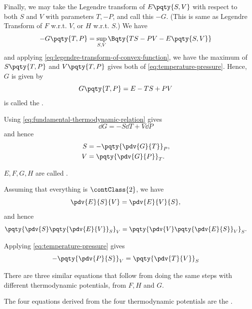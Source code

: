 \begin{example}
    Finally, we may take the Legendre transform of \(E \pqty{S, V}\) with respect to both \(S\) and \(V\) with parameters \(T, -P\), and call this \(-G\). (This is same as Legendre Transform of \(F\) w.r.t. \(V\), or \(H\) w.r.t. \(S\).) We have
    \[
        -G \pqty{T, P} = \sup_{S, V} \Bqty{TS - PV - E \pqty{S, V}}
    \]
    and applying \eqref{eq:legendre-transform-of-convex-function}, we have the maximum of \(S\pqty{T, P}\) and \(V\pqty{T, P}\) gives both of \eqref{eq:temperature-pressure}. Hence, \(G\) is given by
    \[
        G\pqty{T, P} = E - TS + PV
    \]
    is called the .

    Using \eqref{eq:fundamental-thermodynamic-relation} gives
    \[
        \dd{G} = -S \dd{T} + V \dd{P}
    \]
    and hence
    \begin{align*}
        S &= - \pqty{\pdv{G}{T}}_{P}, \\
        V &= \pqty{\pdv{G}{P}}_{T}.
    \end{align*}
\end{example}

\begin{definition}
    \(E, F, G, H\) are called .
\end{definition}

Assuming that everything is \(\contClass{2}\), we have
\[
    \pdv{E}{S}{V} = \pdv{E}{V}{S},
\]
and hence
\[
    \pqty{\pdv{S} \pqty{\pdv{E}{V}}_S}_{V} = \pqty{\pdv{V} \pqty{\pdv{E}{S}}_{V}}_{S}.
\]

Applying \eqref{eq:temperature-pressure} gives
\[
    - \pqty{\pdv{P}{S}}_{V} = \pqty{\pdv{T}{V}}_{S}
\]

There are three similar equations that follow from doing the same steps with different thermodynamic potentials, from \(F, H\) and \(G\).

\begin{definition}
    The four equations derived from the four thermodynamic potentials are the .
\end{definition}